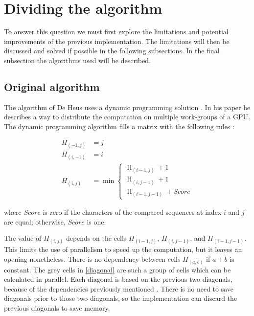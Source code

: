 \section{Dividing the algorithm} \label{q1}
To answer this question we must first explore the limitations and potential improvements of the previous implementation.
The limitations will then be discussed and solved if possible in the following subsections.
In the final subsection the algorithms used will be described.

\subsection{Original algorithm} \label{originalalg}
The algorithm of De Heus uses a dynamic programming solution \cite{Heus}.
In his paper he describes a way to distribute the computation on multiple work-groups of a GPU.
The dynamic programming algorithm fills a matrix with the following rules \cite{Jordan}:

\begin{equation} \label{eq1}
\begin{split}
H_{(-1,j)} & = j \\
H_{(i,-1)} & = i \\
H_{(i,j)} & = \min \begin{cases}
          \operatorname{H}_{(i-1,j)} + 1 \\
          \operatorname{H}_{(i,j-1)} + 1 \\
          \operatorname{H}_{(i-1,j-1)} + Score
\end{cases}
\end{split}
\end{equation}

where $Score$ is zero if the characters of the compared sequences at index $i$ and $j$ are equal; otherwise, $Score$ is one.

The value of $H_{(i,j)}$ depends on the cells $H_{(i-1,j)}$, $H_{(i,j-1)}$, and $H_{(i-1,j-1)}$.
This limits the use of parallelism to speed up the computation, but it leaves an opening nonetheless.
There is no dependency between cells $H_{(a,b)}$ if $a + b$ is constant.
The grey cells in \cref{diagonal} are such a group of cells which can be calculated in parallel.
Each diagonal is based on the previous two diagonals, because of the dependencies previously mentioned \cite{Meyers}.
There is no need to save diagonals prior to those two diagonals, so the implementation can discard the previous diagonals to save memory.

